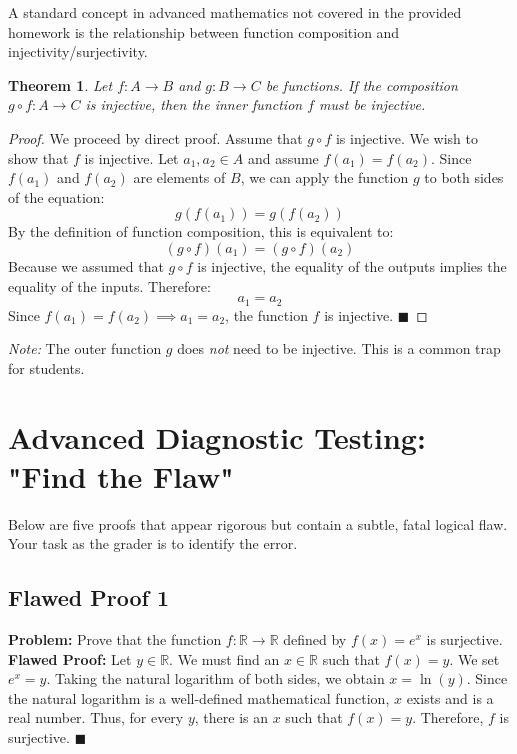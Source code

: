 \documentclass[11pt, a4paper]{article}
\newtheorem{theorem}{Theorem}[section]
\theoremstyle{definition}
\theoremstyle{remark}
\newcommand{\R}{\mathbb{R}}
\begin{document}
A standard concept in advanced mathematics not covered in the provided homework is the relationship between function composition and injectivity/surjectivity. 

\begin{theorem}
Let $f: A \to B$ and $g: B \to C$ be functions. If the composition $g \circ f: A \to C$ is injective, then the inner function $f$ must be injective.
\end{theorem}
\begin{proof}
We proceed by direct proof. Assume that $g \circ f$ is injective. We wish to show that $f$ is injective. 
Let $a_1, a_2 \in A$ and assume $f(a_1) = f(a_2)$. 
Since $f(a_1)$ and $f(a_2)$ are elements of $B$, we can apply the function $g$ to both sides of the equation:
\[ g(f(a_1)) = g(f(a_2)) \]
By the definition of function composition, this is equivalent to:
\[ (g \circ f)(a_1) = (g \circ f)(a_2) \]
Because we assumed that $g \circ f$ is injective, the equality of the outputs implies the equality of the inputs. Therefore:
\[ a_1 = a_2 \]
Since $f(a_1) = f(a_2) \implies a_1 = a_2$, the function $f$ is injective. $\blacksquare$
\end{proof}
\textit{Note:} The outer function $g$ does \textit{not} need to be injective. This is a common trap for students.

\section{Advanced Diagnostic Testing: "Find the Flaw"}

Below are five proofs that appear rigorous but contain a subtle, fatal logical flaw. Your task as the grader is to identify the error.

\subsection{Flawed Proof 1}
\textbf{Problem:} Prove that the function $f: \R \to \R$ defined by $f(x) = e^x$ is surjective. \\
\textbf{Flawed Proof:} Let $y \in \R$. We must find an $x \in \R$ such that $f(x) = y$. We set $e^x = y$. Taking the natural logarithm of both sides, we obtain $x = \ln(y)$. Since the natural logarithm is a well-defined mathematical function, $x$ exists and is a real number. Thus, for every $y$, there is an $x$ such that $f(x) = y$. Therefore, $f$ is surjective. $\blacksquare$
\end{document}
